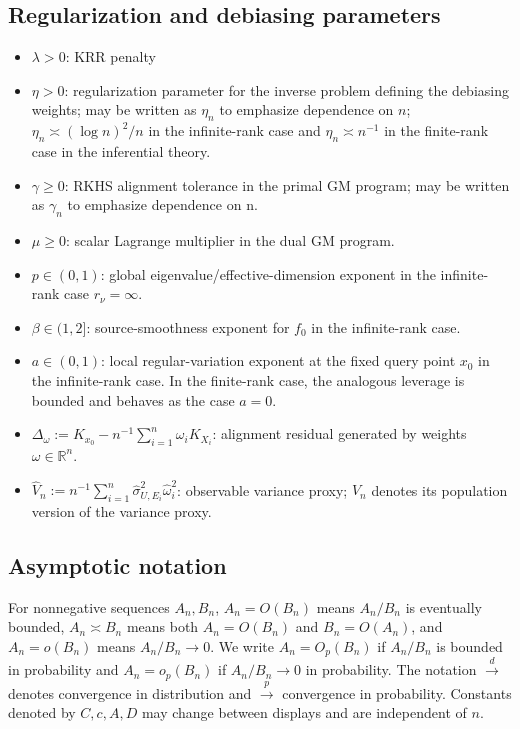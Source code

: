 \documentclass[11pt]{article}
\newcommand{\R}{\mathbb{R}}
\begin{document}
\subsection*{Regularization and debiasing parameters}
\begin{itemize}[leftmargin=2em]
  \item $\lambda>0$: KRR penalty 
  \item $\eta>0$: regularization parameter for the inverse problem defining the debiasing weights; may be written as $\eta_n$ to emphasize dependence on $n$; $\eta_n\asymp (\log n)^2/n$ in the infinite-rank case and $\eta_n\asymp n^{-1}$ in the finite-rank case in the inferential theory.
  \item $\gamma\ge0$: RKHS alignment tolerance in the primal GM program; may be written as $\gamma_n$ to emphasize dependence on n.
  \item $\mu\ge0$: scalar Lagrange multiplier in the dual GM program.
  \item $p\in(0,1)$: global eigenvalue/effective-dimension exponent in the infinite-rank case $r_\nu=\infty$.
  \item $\beta\in(1,2]$: source-smoothness exponent for $f_0$ in the infinite-rank case. 
  \item $a\in(0,1)$: local regular-variation exponent at the fixed query point $x_0$ in the infinite-rank case. In the finite-rank case, the analogous leverage is bounded and behaves as the case $a=0$.
  \item $\Delta_\omega:=K_{x_0}-n^{-1}\sum_{i=1}^n\omega_iK_{X_i}$: alignment residual generated by weights $\omega\in\R^n$.
  \item $\widehat V_n:=n^{-1}\sum_{i=1}^n\widehat\sigma_{U,E_i}^2\widehat\omega_i^2$: observable variance proxy; $V_n$ denotes its population version of the variance proxy.
\end{itemize}

\subsection*{Asymptotic notation}
For nonnegative sequences $A_n,B_n$, $A_n=O(B_n)$ means $A_n/B_n$ is eventually bounded, $A_n\asymp B_n$ means both $A_n=O(B_n)$ and $B_n=O(A_n)$, and $A_n=o(B_n)$ means $A_n/B_n\to0$. We write $A_n=O_p(B_n)$ if $A_n/B_n$ is bounded in probability and $A_n=o_p(B_n)$ if $A_n/B_n\to0$ in probability. The notation $\overset{d}{\to}$ denotes convergence in distribution and $\overset{p}{\to}$ convergence in probability. Constants denoted by $C,c,A,D$ may change between displays and are independent of $n$.
\end{document}
